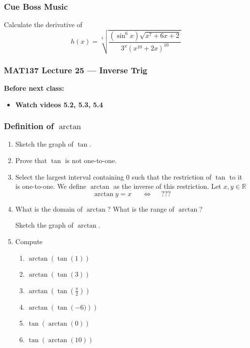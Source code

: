 \documentclass[14pt]{beamer}
\newcommand {\DS} [1] {${\displaystyle #1}$}
\newcommand {\R}{\mathbb{R}}
\newcommand{\setsize}[1]{\fontsize{#1}{#1}\selectfont} %
\newcommand{\smallerfont}{\setsize{13}} %
\begin{document}
\begin{frame}[t]
\frametitle{Cue Boss Music}

\vspace{5mm} 
\begin{block}{}
Calculate the derivative of 
	$$
		h(x) = \sqrt[3]{\frac{\left( \sin^6 x \right) \sqrt{x^7+6x+2}}{3^x \left(x^{10}+2x\right)^{10}}}
	$$
\end{block}


\end{frame}










\begin{frame}
	\frametitle{MAT137 Lecture 25 --- Inverse Trig}

	\vfill
	{\bf Before next class:}
		\begin{itemize} \normalsize
			\item {\bf Watch videos  5.2, 5.3, 5.4}
		\end{itemize}
\end{frame}

\begin{frame}[t]
\smallerfont
\frametitle{Definition of $\arctan$}

\begin{enumerate}
	\item  Sketch the graph of $\tan$.
	\item  Prove that $\tan$ is not one-to-one.
	\item  Select the largest interval containing $0$ such that the restriction of $\tan$ to it is one-to-one.
		We define $\arctan$ as the inverse of this restriction.  \quad Let $x, y \in \R$
		$$\arctan y = x \; \quad \; \iff \; \quad ???$$
	\item	What is the domain of \DS{\arctan}? 
		What is the range of \DS{\arctan}?
	
	 Sketch the graph of $\arctan$.
	\item Compute
		\begin{multicols}{2}
			\begin{enumerate}
				\item  \DS{\arctan \left( \tan \left( 1 \right) \right) }
				\item  \DS{\arctan \left( \tan \left( 3\right) \right) }
				\item \DS{\arctan \left( \tan \left( \frac{\pi}{2}\right) \right) }
				\item  \DS{\arctan \left( \tan \left( -6)\right) \right) }
				\item \DS{\tan \left( \arctan \left( 0\right) \right) }
				\item \DS{\tan \left( \arctan \left( 10\right) \right) }
			\end{enumerate}		
		\end{multicols}
\end{enumerate}



\end{frame}
\end{document}
